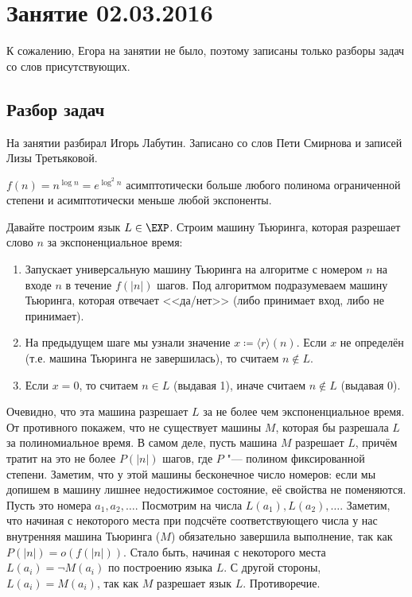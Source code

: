 \chapter{Занятие 02.03.2016}

К сожалению, Егора на занятии не было, поэтому записаны только разборы задач
со слов присутствующих.

\section{Разбор задач}
	На занятии разбирал Игорь Лабутин.
	Записано со слов Пети Смирнова и записей Лизы Третьяковой.

	\begin{assertion}
		$f(n)=n^{\log n}=e^{\log^2 n}$ асимптотически больше любого полинома ограниченной степени
		и асимптотически меньше любой экспоненты.
	\end{assertion}
	Давайте построим язык $L \in \EXP$.
	Строим машину Тьюринга, которая разрешает слово $n$ за экспоненциальное время:
	\begin{enumerate}
		\item
			Запускает универсальную машину Тьюринга на алгоритме с номером $n$ на входе $n$ в течение $f(|n|)$ шагов.
			Под алгоритмом подразумеваем машину Тьюринга, которая отвечает <<да/нет>> (либо принимает вход, либо не принимает).
		\item
			На предыдущем шаге мы узнали значение $x \coloneq \langle r \rangle(n)$.
			Если $x$ не определён (т.е. машина Тьюринга не завершилась), то считаем $n \notin L$.
		\item
			Если $x=0$, то считаем $n \in L$ (выдавая 1), иначе считаем $n \notin L$ (выдавая 0).
	\end{enumerate}
	Очевидно, что эта машина разрешает $L$ за не более чем экспоненциальное время.
	От противного покажем, что не существует машины $M$, которая бы разрешала $L$ за полиномиальное время.
	В самом деле, пусть машина $M$ разрешает $L$, причём тратит на это не более $P(|n|)$ шагов,
	где $P$ "--- полином фиксированной степени.
	Заметим, что у этой машины бесконечное число номеров: если мы допишем в машину лишнее недостижимое состояние,
	её свойства не поменяются.
	Пусть это номера $a_1, a_2, \dots$.
	Посмотрим на числа $L(a_1), L(a_2), \dots$.
	Заметим, что начиная с некоторого места при подсчёте соответствующего числа у нас внутренняя машина Тьюринга ($M$)
	обязательно завершила выполнение, так как $P(|n|)=o(f(|n|))$.
	Стало быть, начиная с некоторого места $L(a_i)=\lnot M(a_i)$ по построению языка $L$.
	С другой стороны, $L(a_i)=M(a_i)$, так как $M$ разрешает язык $L$.
	Противоречие.

